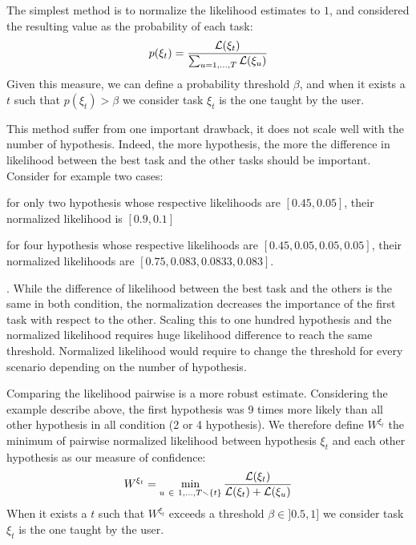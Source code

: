 The simplest method is to normalize the likelihood estimates to $1$, and considered the resulting value as the probability of each task:
%
\begin{eqnarray}
p(\xi_t) = \frac{\mathcal{L}(\xi_t)}{\sum_{u = 1,\ldots, T} \mathcal{L}(\xi_u)}
\label{eq:probanormalize} 
\end{eqnarray}
%
Given this measure, we can define a probability threshold $\beta$, and when it exists a $t$ such that $p(\xi_t) > \beta$ we consider task $\xi_t$ is the one taught by the user.

This method suffer from one important drawback, it does not scale well with the number of hypothesis. Indeed, the more hypothesis, the more the difference in likelihood between the best task and the other tasks should be important. Consider for example two cases: \begin{inparaenum}[a)] \item for only two hypothesis whose respective likelihoods are $[0.45, 0.05]$, their normalized likelihood is $[0.9,0.1]$ \item for four hypothesis whose respective likelihoods are $[0.45, 0.05, 0.05, 0.05]$, their normalized likelihoods are $[0.75, 0.083, 0.0833, 0.083]$. \end{inparaenum}. While the difference of likelihood between the best task and the others is the same in both condition, the normalization decreases the importance of the first task with respect to the other. Scaling this to one hundred hypothesis and the normalized likelihood requires huge likelihood difference to reach the same threshold. Normalized likelihood would require to change the threshold for every scenario depending on the number of hypothesis. 

Comparing the likelihood pairwise is a more robust estimate. Considering the example describe above, the first hypothesis was 9 times more likely than all other hypothesis in all condition (2 or 4 hypothesis). We therefore define $W^{\xi_t}$  the minimum of pairwise normalized likelihood between hypothesis $\xi_t$ and each other hypothesis as our measure of confidence:
%
\begin{eqnarray}
W^{\xi_t} = \min_{u~\in~{1, \ldots, T} \smallsetminus \{t\}} \frac{\mathcal{L}(\xi_t)}{\mathcal{L}(\xi_t) + \mathcal{L}(\xi_u)}
\label{eq:probapairwise}
\end{eqnarray}
%
When it exists a $t$ such that $W^{\xi_t}$ exceeds a threshold $\beta \in ]0.5,1]$ we consider task $\xi_t$ is the one taught by the user.

